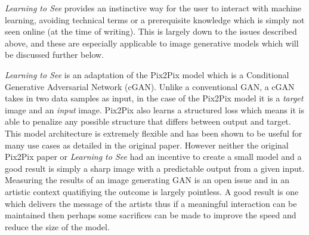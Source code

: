 \documentclass[a4paper]{article}
\begin{document}
\textit{Learning to See} provides an instinctive way for the user to interact with machine learning, avoiding technical terms or a prerequisite knowledge which is simply not seen online (at the time of writing). This is largely down to the issues described above, and these are especially applicable to image generative models which will be discussed further below.

\textit{Learning to See} is an adaptation of the Pix2Pix model\cite{1611.07004} which is a Conditional Generative Adversarial Network (cGAN)\cite{1701.00160}. Unlike a conventional GAN\cite{1406.2661}, a cGAN takes in two data samples as input, in the case of the Pix2Pix model it is a \textit{target} image and an \textit{input} image. Pix2Pix also learns a structured loss which means it is able to penalize any possible structure that differs between output and target\cite{1611.07004}. This model architecture is extremely flexible and has been shown to be useful for many use cases as detailed in the original paper. However neither the original Pix2Pix paper or \textit{Learning to See} had an incentive to create a small model and a good result is simply a sharp image with a predictable output from a given input. Measuring the results of an image generating GAN is an open issue\cite{1606.03498} and in an artistic context quatifiying the outcome is largely pointless. A good result is one which delivers the message of the artists thus if a meaningful interaction can be maintained then perhaps some sacrifices can be made to improve the speed and reduce the size of the model.
\end{document}
